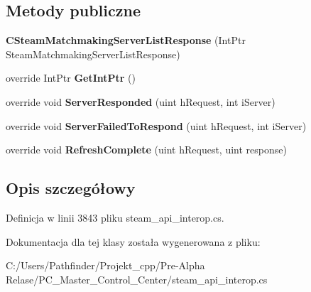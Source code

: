 \subsection*{Metody publiczne}
\begin{DoxyCompactItemize}
\item 
\mbox{\label{class_valve_1_1_steamworks_1_1_c_steam_matchmaking_server_list_response_ae3d3e42fb984c5c1c49567a76898d0fe}} 
{\bfseries C\+Steam\+Matchmaking\+Server\+List\+Response} (Int\+Ptr Steam\+Matchmaking\+Server\+List\+Response)
\item 
\mbox{\label{class_valve_1_1_steamworks_1_1_c_steam_matchmaking_server_list_response_a6d12bc91d6328bef5edd4d6cea2023c9}} 
override Int\+Ptr {\bfseries Get\+Int\+Ptr} ()
\item 
\mbox{\label{class_valve_1_1_steamworks_1_1_c_steam_matchmaking_server_list_response_abc8e9e88179be78287beb2cd9f37050e}} 
override void {\bfseries Server\+Responded} (uint h\+Request, int i\+Server)
\item 
\mbox{\label{class_valve_1_1_steamworks_1_1_c_steam_matchmaking_server_list_response_aad27f032e8bda7028cd0cafaf8a089f2}} 
override void {\bfseries Server\+Failed\+To\+Respond} (uint h\+Request, int i\+Server)
\item 
\mbox{\label{class_valve_1_1_steamworks_1_1_c_steam_matchmaking_server_list_response_a37f0afb3b90526265d9d2a4b5e011c95}} 
override void {\bfseries Refresh\+Complete} (uint h\+Request, uint response)
\end{DoxyCompactItemize}


\subsection{Opis szczegółowy}


Definicja w linii 3843 pliku steam\+\_\+api\+\_\+interop.\+cs.



Dokumentacja dla tej klasy została wygenerowana z pliku\+:\begin{DoxyCompactItemize}
\item 
C\+:/\+Users/\+Pathfinder/\+Projekt\+\_\+cpp/\+Pre-\/\+Alpha Relase/\+P\+C\+\_\+\+Master\+\_\+\+Control\+\_\+\+Center/steam\+\_\+api\+\_\+interop.\+cs\end{DoxyCompactItemize}
